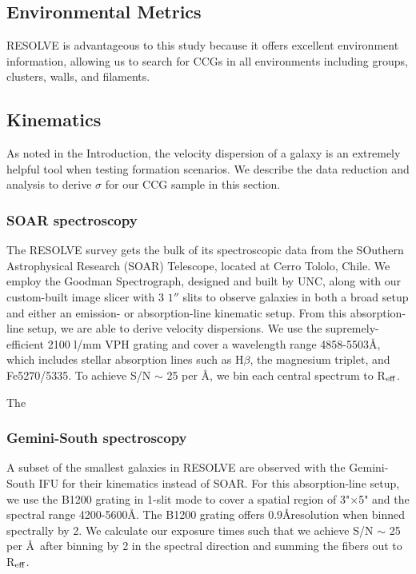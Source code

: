 \documentclass[iop,apj,twocolappendix]{emulateapj}
\newcommand{\Reff}{R$_{\rm eff}$}
\begin{document}
\subsection{Environmental Metrics}
\label{env}
\noindent RESOLVE is advantageous to this study because it offers excellent environment information, allowing us to search for CCGs in all environments including groups, clusters, walls, and filaments. \cite{Moffett2015} 

\subsection{Kinematics}
\label{kin}

\noindent As noted in the Introduction, the velocity dispersion of a galaxy is an extremely helpful tool when testing formation scenarios. We describe the data reduction and analysis to derive $\sigma$ for our CCG sample in this section. 

\subsubsection{SOAR spectroscopy}
\noindent The RESOLVE survey gets the bulk of its spectroscopic data from the SOuthern Astrophysical Research (SOAR) Telescope, located at Cerro Tololo, Chile. We employ the Goodman Spectrograph, designed and built by UNC, along with our custom-built image slicer with 3 $1''$ slits to observe galaxies in both a broad setup and either an emission- or absorption-line kinematic setup. From this absorption-line setup, we are able to derive velocity dispersions. We use the supremely-efficient 2100 l/mm VPH grating and cover a wavelength range 4858-5503\AA, which includes stellar absorption lines such as H$\beta$, the magnesium triplet, and Fe5270/5335. To achieve S/N $\sim$ 25 per \AA, we bin each central spectrum to \Reff.

The 

\subsubsection{Gemini-South spectroscopy}

\noindent A subset of the smallest galaxies in RESOLVE are observed with the Gemini-South IFU for their kinematics instead of SOAR. For this absorption-line setup, we use the B1200 grating in 1-slit mode to cover a spatial region of 3"$\times$5" and the spectral range 4200-5600\AA. The B1200 grating offers 0.9\AA resolution when binned spectrally by 2. We calculate our exposure times such that we achieve S/N $\sim$ 25 per \AA\,  after binning by 2 in the spectral direction and summing the fibers out to \Reff.
\end{document}
